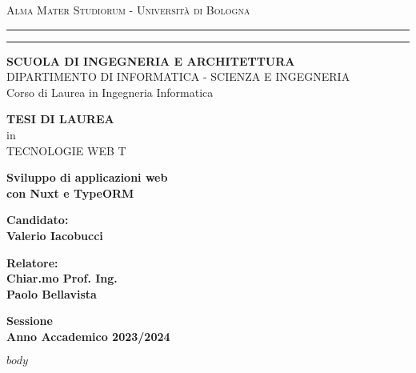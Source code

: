 \documentclass[11pt,a4paper]{report}
\begin{document}
\begin{titlepage}
	\begin{center}
	{{\Large{\textsc{Alma Mater Studiorum - Universit\`a di
	Bologna}}}} \rule[0.1cm]{15.8cm}{0.1mm}
	\rule[0.5cm]{15.8cm}{0.6mm}
	{\small{\bf SCUOLA DI INGEGNERIA E ARCHITETTURA}\\
	DIPARTIMENTO DI INFORMATICA - SCIENZA E INGEGNERIA\\
	Corso di Laurea in Ingegneria Informatica}
	\end{center}
	\vspace{15mm}
	\begin{center}
	{\large{\bf TESI DI LAUREA}}\\
	\vspace{2mm}
	{\large{in}}\\
	\vspace{2mm}
	{\large{TECNOLOGIE WEB T}}\\
	\end{center}
	\vspace{15mm}
	\begin{center}
	{\LARGE{\bf Sviluppo di applicazioni web}}\\
	\vspace{3mm}
	{\LARGE{\bf con Nuxt e TypeORM}}\\
	\end{center}
	\vspace{40mm}
	\par
	\noindent
	\begin{minipage}[t]{0.47\textwidth}
	{\large{\bf Candidato:\\
	Valerio Iacobucci}}
	\end{minipage}
	\hfill
	\begin{minipage}[t]{0.47\textwidth}\raggedleft
	{\large{\bf Relatore:\\
	Chiar.mo Prof. Ing.\\
	Paolo Bellavista}}
	\end{minipage}
	\vspace{20mm}
	\begin{center}
	{\large{\bf Sessione\\
	Anno Accademico 2023/2024 }}
	\end{center}
\end{titlepage}

\shipout\null

\begingroup
	\hypersetup{linkcolor=black}
	\tableofcontents
\endgroup

\newpage

$body$
\end{document}
